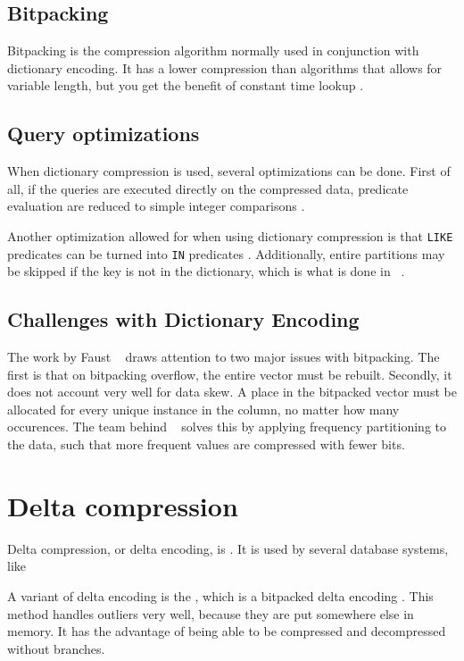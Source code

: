 \subsection{Bitpacking}
\label{sub:Bitpacking}
Bitpacking is the compression algorithm normally used in conjunction with dictionary encoding. It has a lower compression than algorithms that allows for variable length, but you get the benefit of constant time lookup \cite{Raman2008-gi}.

\subsection{Query optimizations}
\label{sub:Query optimizations}
When dictionary compression is used, several optimizations can be done. First of all, if the queries are executed directly on the compressed data, predicate evaluation are reduced to simple integer comparisons \cite{Johnson2008-cp}.  

Another optimization allowed for when using dictionary compression is that \texttt{LIKE} predicates can be turned into \texttt{IN} predicates \cite{Barber2012-xt}. Additionally, entire partitions may be skipped if the key is not in the dictionary, which is what is done in \blink~\cite{Barber2012-xt}.

\subsection{Challenges with Dictionary Encoding}
\label{sub:Challenges with Dictionary Encoding}
The work by Faust \ea~\cite{Faust2015-ke} draws attention to two major issues with bitpacking. The first is that on bitpacking overflow, the entire vector must be rebuilt. Secondly, it does not account very well for data skew. A place in the bitpacked vector must be allocated for every unique instance in the column, no matter how many occurences. The team behind \blink~\cite{Raman2008-gi} solves this by applying frequency partitioning to the data, such that more frequent values are compressed with fewer bits.

\section{Delta compression}
\label{sec:Delta compression}
Delta compression, or delta encoding, is . It is used by several database systems, like ~\cite{Raman2008-gi}

A variant of delta encoding is the , which is a bitpacked delta encoding \cite{Bjorklund2011-wh}. This method handles outliers very well, because they are put somewhere else in memory. It has the advantage of being able to be compressed and decompressed without branches.

